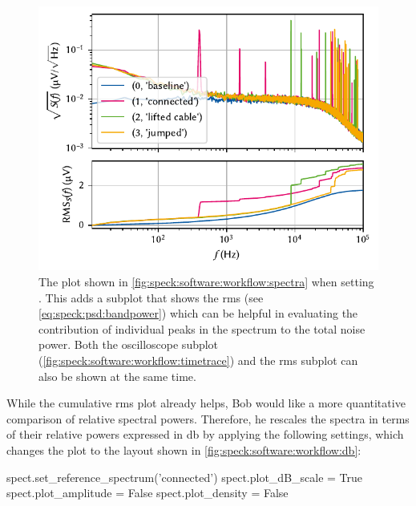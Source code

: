 \begin{figure}
    \centering
    \includegraphics{img/pdf/spectrometer/workflow_cumulative}
    \caption[]{
        The \pyspeck plot shown in \cref{fig:speck:software:workflow:spectra} when setting .
        This adds a subplot that shows the \gls{rms} (see \cref{eq:speck:psd:bandpower}) which can be helpful in evaluating the contribution of individual peaks in the spectrum to the total noise power.
        Both the oscilloscope subplot (\cref{fig:speck:software:workflow:timetrace}) and the \gls{rms} subplot can also be shown at the same time.
    }
    \label{fig:speck:software:workflow:cumulative}
\end{figure}

While the cumulative \gls{rms} plot already helps, Bob would like a more quantitative comparison of relative spectral powers.
Therefore, he rescales the spectra in terms of their relative powers expressed in \unit{\decibel}
by applying the following settings, which changes the plot to the layout shown in \cref{fig:speck:software:workflow:db}:

\begin{pycode}
    spect.set_reference_spectrum('connected')
    spect.plot_dB_scale = True
    spect.plot_amplitude = False
    spect.plot_density = False
\end{pycode}

